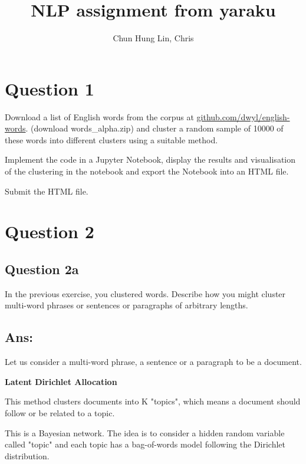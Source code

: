 \documentclass{kthreport}
\title{NLP assignment from yaraku}
\author{Chun Hung Lin, Chris}
\begin{document}
\maketitle


\section{Question 1}

Download a list of English words from the corpus at \hspace{0.1em}
\href{https://github.com/dwyl/english-words}{github.com/dwyl/english-words}.
(download words\_alpha.zip) and cluster a random sample of 10000 of
these words into different clusters using a suitable method.

Implement the code in a Jupyter Notebook, display the results and visualisation
of the clustering in the notebook and export the Notebook into an HTML file.

Submit the HTML file.

\section{Question 2}
\subsection{Question 2a}
In the previous exercise, you clustered words.
Describe how you might cluster multi-word phrases or sentences or paragraphs of
arbitrary lengths.

\subsection*{Ans:}

Let us consider a multi-word phrase, a sentence or a paragraph to be a document.

\textbf{Latent Dirichlet Allocation}

This method clusters documents into K "topics", which means a document should
follow or be related to a topic.

This is a Bayesian network. The idea is to consider a hidden random variable
called "topic" and each topic has a bag-of-words model following the
Dirichlet distribution.
\end{document}
